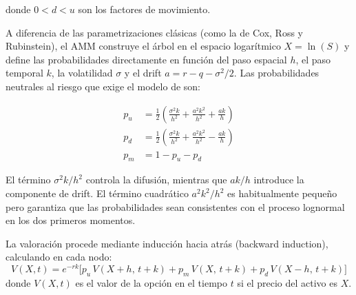 donde $0 < d < u$ son los factores de movimiento.

A diferencia de las parametrizaciones clásicas (como la de Cox, Ross y Rubinstein), el AMM construye el árbol en el espacio logarítmico $X = \ln(S)$ y define las probabilidades directamente en función del paso espacial $h$, el paso temporal $k$, la volatilidad $\sigma$ y el drift $a = r - q - \sigma^2/2$. Las probabilidades neutrales al riesgo que exige el modelo de \citep{figlewski1999adaptive} son:

\begin{align}
p_u &= \frac{1}{2}\left(\frac{\sigma^2 k}{h^2} + \frac{a^2 k^2}{h^2} + \frac{a k}{h}\right) \\
p_d &= \frac{1}{2}\left(\frac{\sigma^2 k}{h^2} + \frac{a^2 k^2}{h^2} - \frac{a k}{h}\right) \\
p_m &= 1 - p_u - p_d
\end{align}

El término $\sigma^2 k / h^2$ controla la difusión, mientras que $a k / h$ introduce la componente de drift. El término cuadrático $a^2 k^2 / h^2$ es habitualmente pequeño pero garantiza que las probabilidades sean consistentes con el proceso lognormal en los dos primeros momentos.

La valoración procede mediante inducción hacia atrás (backward induction), calculando en cada nodo:
\begin{equation}
V(X,t) = e^{-r k}\bigl[p_u\, V(X+h,\,t+k) + p_m\, V(X,\,t+k) + p_d\, V(X-h,\,t+k)\bigr]
\end{equation}
donde $V(X, t)$ es el valor de la opción en el tiempo $t$ si el precio del activo es $X$.

